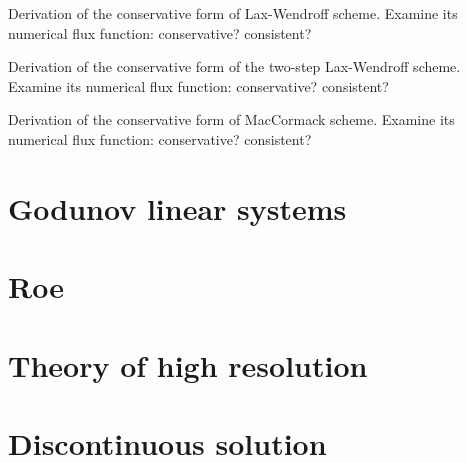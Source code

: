 \documentclass[12pt]{article}
\begin{document}
\begin{example}
	Derivation of the conservative form of Lax-Wendroff scheme. 
	Examine its numerical flux function: conservative? consistent?
\end{example}

\begin{example}
	Derivation of the conservative form of the two-step Lax-Wendroff scheme. 
	Examine its numerical flux function: conservative? consistent?
\end{example}

\begin{example}
	Derivation of the conservative form of MacCormack scheme. 
	Examine its numerical flux function: conservative? consistent?
\end{example}

\section{Godunov linear systems}

\section{Roe}

\section{Theory of high resolution}

\section{Discontinuous solution}



\end{document}
